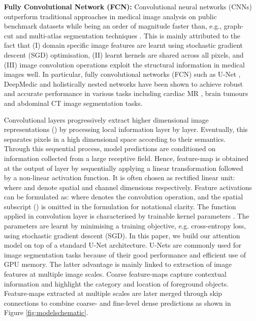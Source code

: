 \documentclass{article}
\begin{document}
\textbf{Fully Convolutional Network (FCN):} Convolutional neural networks (CNNs) outperform traditional approaches in medical image analysis on public benchmark datasets \cite{khened2018fully, liao2017evaluate} while being an order of magnitude faster than, e.g., graph-cut and multi-atlas segmentation techniques \cite{wolz2013automated}. This is mainly attributed to the fact that (I) domain specific image features are learnt using stochastic gradient descent (SGD) optimisation, (II) learnt kernels are shared across all pixels, and (III) image convolution operations exploit the structural information in medical images well. In particular, fully convolutional networks (FCN) \cite{long2015fully} such as U-Net \cite{ronneberger2015u}, DeepMedic \cite{kamnitsas2017efficient} and holistically nested networks \cite{lee2015deeply, xie2015holistically} have been shown to achieve robust and accurate performance in various tasks including cardiac MR \cite{bai2017human}, brain tumours \cite{kamnitsas2018ensembles} and abdominal CT \cite{roth2018media, roth2017hierarchical} image segmentation tasks.

Convolutional layers progressively extract higher dimensional image representations () by processing local information layer by layer. Eventually, this separates pixels in a high dimensional space according to their semantics. Through this sequential process, model predictions are conditioned on information collected from a large receptive field. Hence, feature-map  is obtained at the output of layer  by sequentially applying a linear transformation followed by a non-linear activation function. It is often chosen as rectified linear unit:  where  and  denote spatial and channel dimensions respectively. Feature activations can be formulated as:  where  denotes the convolution operation, and the spatial subscript () is omitted in the formulation for notational clarity. The function  applied in convolution layer  is characterised by trainable kernel parameters . The parameters are learnt by minimising a training objective, e.g. cross-entropy loss, using stochastic gradient descent (SGD). In this paper, we build our attention model on top of a standard U-Net architecture. U-Nets are commonly used for image segmentation tasks because of their good performance and efficient use of GPU memory. The latter advantage is mainly linked to extraction of image features at multiple image scales. Coarse feature-maps capture contextual information and highlight the category and location of foreground objects. Feature-maps extracted at multiple scales are later merged through skip connections to combine coarse- and fine-level dense predictions as shown in Figure \ref{fig:modelschematic}. 
\end{document}

